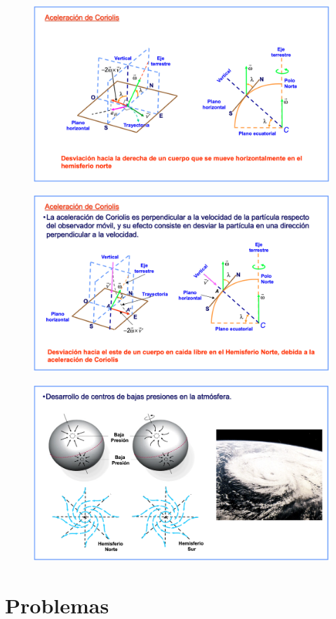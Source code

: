\begin{figure}[H]
	\centering
	\includegraphics[width=.75\textwidth]{imagenes/imagenes10/T10IM13.png}
\end{figure}

\begin{figure}[H]
	\centering
	\includegraphics[width=.8\textwidth]{imagenes/imagenes10/T10IM14.png}
\end{figure}

\begin{figure}[H]
	\centering
	\includegraphics[width=.8\textwidth]{imagenes/imagenes10/T10IM15.png}
\end{figure}

\section{Problemas}

